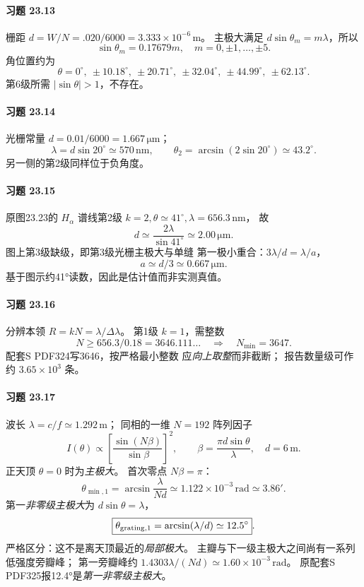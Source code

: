 \paragraph{习题 23.13}
栅距 \(d=W/N=.020/6000
=3.333\times10^{-6}\,\mathrm m\)。
主极大满足 \(d\sin\theta_m=m\lambda\)，所以
\[
\boxed{\sin\theta_m=0.17679m,\quad m=0,\pm1,\ldots,\pm5}.
\]
角位置约为
\[
\boxed{\theta=0^\circ,\ \pm10.18^\circ,\ \pm20.71^\circ,\
\pm32.04^\circ,\ \pm44.99^\circ,\ \pm62.13^\circ}.
\]
第6级所需 \(|\sin\theta|>1\)，不存在。
\paragraph{习题 23.14}
光栅常量 \(d=0.01/6000=1.667\,\mathrm{\mu m}\)；
\[
\boxed{\lambda=d\sin20^\circ\simeq570\,\mathrm{nm}},
\qquad
\boxed{\theta_2=\arcsin(2\sin20^\circ)
\simeq43.2^\circ}.
\]
另一侧的第2级同样位于负角度。
\paragraph{习题 23.15}
原图23.23的 \(H_\alpha\) 谱线第2级
\(k=2,\theta\simeq41^\circ,\lambda=656.3\,\mathrm{nm}\)，
故
\[
\boxed{d\simeq\frac{2\lambda}{\sin41^\circ}
\simeq2.00\,\mathrm{\mu m}}.
\]
图上第3级缺级，即第3级光栅主极大与单缝
第一极小重合：\(3\lambda/d=\lambda/a\)，
\[
\boxed{a\simeq d/3\simeq0.667\,\mathrm{\mu m}}.
\]
基于图示约41°读数，因此是估计值而非实测真值。
\paragraph{习题 23.16}
分辨本领 \(R=kN=\lambda/\Delta\lambda\)。
第1级 \(k=1\)，需整数
\[
N\ge656.3/0.18=3646.111\ldots
\quad\Longrightarrow\quad\boxed{N_{\min}=3647}.
\]
配套S PDF324写3646，按严格最小整数
应\emph{向上取整}而非截断；
报告数量级可作约 \(3.65\times10^3\) 条。
\paragraph{习题 23.17}
波长 \(\lambda=c/f\simeq1.292\,\mathrm m\)；
同相的一维 \(N=192\) 阵列因子
\[
I(\theta)\propto
\left[\frac{\sin(N\beta)}{\sin\beta}\right]^2,\qquad
\beta=\frac{\pi d\sin\theta}{\lambda},\quad d=6\,\mathrm m.
\]
正天顶 \(\theta=0\) 时为\emph{主极大}。
首次零点 \(N\beta=\pi\)：
\[
\boxed{\theta_{\min,1}=\arcsin\frac{\lambda}{Nd}
\simeq1.122\times10^{-3}\,\mathrm{rad}
\simeq3.86'}.
\]
第一\emph{非零级主极大}为 \(d\sin\theta=\lambda\)，
\[
\boxed{\theta_{\rm grating,1}=\arcsin(\lambda/d)\simeq12.5^\circ}.
\]
严格区分：这不是离天顶最近的\emph{局部极大}。
主瓣与下一级主极大之间尚有一系列低强度旁瓣峰；
第一旁瓣峰约 \(1.4303\lambda/(Nd)
\simeq1.60\times10^{-3}\,\mathrm{rad}\)。
原配套S PDF325报12.4°是\emph{第一非零级主极大}。
